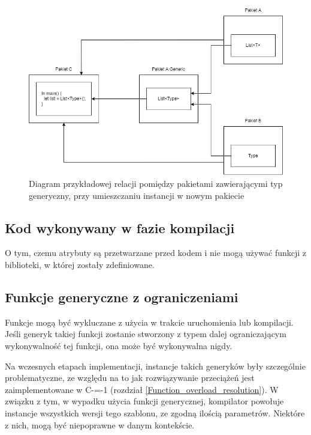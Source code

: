 \begin{figure}
	\caption{Diagram przykładowej relacji pomiędzy pakietami zawierającymi typ generyczny, przy umieszczaniu instancji w nowym pakiecie}
	\label{generic_packages_dependencies:option:new}
	\begin{center}
		\includegraphics[width=\textwidth]{img/generics_placed_in_new.png}
	\end{center}
\end{figure}

\subsection{Kod wykonywany w fazie kompilacji}
O tym, czemu atrybuty są przetwarzane przed kodem i nie mogą używać funkcji z biblioteki, w której zostały zdefiniowane.

\subsection{Funkcje generyczne z ograniczeniami}

Funkcje mogą być wykluczane z użycia w trakcie uruchomienia lub kompilacji. Jeśli generyk takiej funkcji zostanie stworzony z typem dalej ograniczającym wykonywalność tej funkcji, ona może być wykonywalna nigdy.

Na wczesnych etapach implementacji, instancje takich generyków były szczególnie problematyczne, ze względu na to jak rozwiązywanie przeciążeń jest zaimplementowane w C-=-1 (rozdział \ref{Function_overload_resolution}).
W związku z tym, w wypadku użycia funkcji generycznej, kompilator powołuje instancje wszystkich wersji tego szablonu, ze zgodną ilością parametrów.
Niektóre z nich, mogą być niepoprawne w danym kontekście. 

